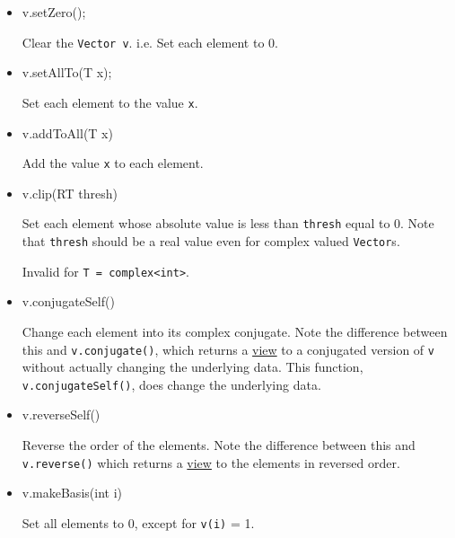 \documentclass[twoside,letterpaper,11pt]{article}
\renewcommand{\tt}[1]{{\lstinline {#1}}}
\begin{document}
\begin{itemize}

\item
\begin{tmvcode}
v.setZero();
\end{tmvcode}
Clear the \tt{Vector v}.  i.e. Set each element to 0.

\item
\begin{tmvcode}
v.setAllTo(T x);
\end{tmvcode}
Set each element to the value \tt{x}.

\item
\begin{tmvcode}
v.addToAll(T x)
\end{tmvcode}
Add the value \tt{x} to each element.

\item
\begin{tmvcode}
v.clip(RT thresh)
\end{tmvcode}
Set each element whose absolute value is less than \tt{thresh} equal to 0.
Note that \tt{thresh} should be a real value even for complex valued
\tt{Vector}s.  

Invalid for \tt{T = complex<int>}.

\item 
\begin{tmvcode}
v.conjugateSelf()
\end{tmvcode}
Change each element into its complex conjugate.  
Note the difference between this and \tt{v.conjugate()}, 
which returns a \underline{view} to a conjugated version of \tt{v} without
actually changing the underlying data.  This function, \tt{v.conjugateSelf()},
does change the underlying data.

\item
\begin{tmvcode}
v.reverseSelf()
\end{tmvcode}
Reverse the order of the elements.  Note the difference between this and 
\tt{v.reverse()} which returns a \underline{view} to the elements in 
reversed order.

\item
\begin{tmvcode}
v.makeBasis(int i)
\end{tmvcode}
Set all elements to 0, except for \tt{v(i)} = 1.


\end{itemize}
\end{document}
